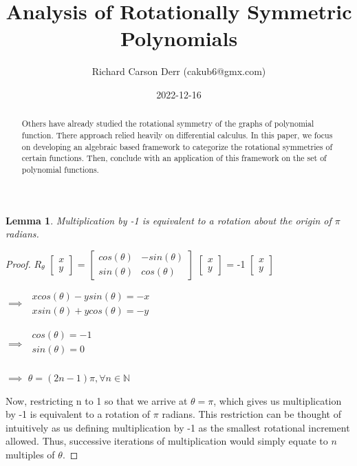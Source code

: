 \documentclass{article}
\title{Analysis of Rotationally Symmetric Polynomials}
\author{Richard Carson Derr (cakub6@gmx.com)}
\date{2022-12-16}
\newtheorem{lemma}{Lemma}
\begin{document}
\maketitle

\begin{abstract}
  Others have already studied the rotational symmetry
  of the graphs of polynomial function. There approach
  relied heavily on differential calculus. In this paper,
  we focus on developing an algebraic based framework
  to categorize the rotational symmetries of certain
  functions. Then, conclude with an application of this
  framework on the set of polynomial functions.
\end{abstract}

\begin{lemma}
  Multiplication by -1 is equivalent to a rotation about the origin of $\pi$ radians.
\end{lemma}

\begin{proof}
  $R_\theta$
  $\begin{bmatrix}
    x \\
    y
  \end{bmatrix}$
  =
  $\begin{bmatrix}
    cos(\theta) & -sin(\theta) \\
    sin(\theta) & cos(\theta)
  \end{bmatrix}$
  $\begin{bmatrix}
    x \\
    y
  \end{bmatrix}$
  =
  -1
  $\begin{bmatrix}
    x \\
    y
  \end{bmatrix}$

  $\implies$
  $\begin{matrix}
    x cos(\theta) - y sin(\theta) = -x\\
    x sin(\theta) + y cos(\theta) = -y
  \end{matrix}$

  $\implies$
  $\begin{matrix}
    cos(\theta) = -1 \\
    sin(\theta) = 0 \\
  \end{matrix}$

  $\implies$
  $\theta = (2n-1)\pi, \forall n \in \mathbb{N}$

  Now, restricting n to 1 so that we arrive at $\theta = \pi$, which
  gives us multiplication by -1 is equivalent to a rotation of $\pi$ radians.
  This restriction can be thought of intuitively as us defining multiplication by
  -1 as the smallest rotational increment allowed. Thus, successive iterations of
  multiplication would simply equate to $n$ multiples of $\theta$.
\end{proof}
\end{document}
